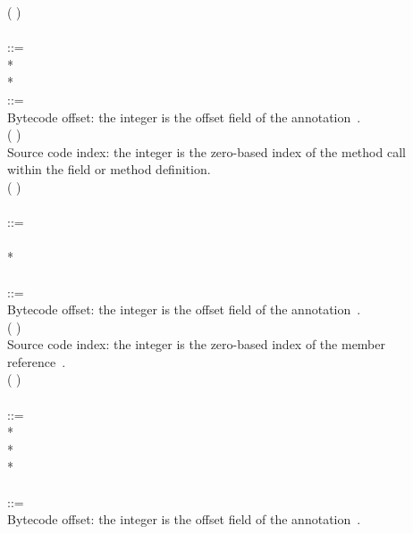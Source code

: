 \documentclass{article}
\begin{document}
\begin{tabbing}
\qquad    \bnfor{} (\bnflit{*} ) \\
\\
 ::= \\
\qquad    {}  \bnflit{:} * \lineend  \\
\qquad    {}*
\\
 ::= \\
\qquad    \bnfcmt Bytecode offset: the integer is the offset field of the annotation~\cite{JSR308-webpage-201110}. \\
\qquad    (\bnflit{\#} ) \\
\qquad    \bnfcmt Source code index: the integer is the zero-based index of the method call \\
\qquad    \bnfcmt within the field or method definition. \\
\qquad    \bnfor{} (\bnflit{*} ) \\
\\
 ::= \\
\qquad    {}  \bnflit{:} \lineend \\
\qquad    {}* \\
\\
 ::= \\
\qquad    \bnfcmt Bytecode offset: the integer is the offset field of the annotation~\cite{JSR308-webpage-201110}. \\
\qquad    (\bnflit{\#} ) \\
\qquad    \bnfcmt Source code index: the integer is the zero-based index of the member \\
\qquad    \bnfcmt reference~\cite{JSR308-webpage-201110}. \\
\qquad    \bnfor{} (\bnflit{*} ) \\
\\
 ::= \\
\qquad    {}  \bnflit{:} * \lineend \\
\qquad    {}* \\
\qquad    {}* \\
\\
 ::= \\
\qquad    \bnfcmt Bytecode offset: the integer is the offset field of the annotation~\cite{JSR308-webpage-201110}. \\

\end{tabbing}
\end{document}
